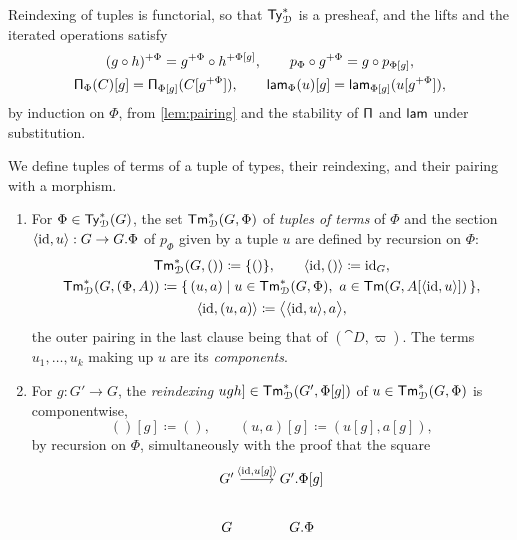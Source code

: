 Reindexing of tuples is functorial, so that $\mathsf{Ty}^*_{\mathcal{D}}$ is a presheaf, and the lifts and the iterated operations satisfy
\begin{equation}\label{eq:iterated-stability}
    \begin{gathered}
        (g \circ h)^{+\Phi} = g^{+\Phi} \circ h^{+\Phi[g]}, \qquad p_\Phi \circ g^{+\Phi} = g \circ p_{\Phi[g]},\\
        \mathsf{\Pi}_\Phi(C)[g] = \mathsf{\Pi}_{\Phi[g]}(C[g^{+\Phi}]), \qquad \mathsf{lam}_\Phi(u)[g] = \mathsf{lam}_{\Phi[g]}(u[g^{+\Phi}]),
    \end{gathered}
\end{equation}
by induction on $\Phi$, from \cref{lem:pairing} and the stability of $\mathsf{\Pi}$ and $\mathsf{lam}$ under substitution.

\begin{definition}\label{def:iterated-pairing}
    We define tuples of terms of a tuple of types, their reindexing, and their pairing with a morphism.
    \begin{enumerate}
        \item For $\Phi \in \mathsf{Ty}^*_{\mathcal{D}}(G)$, the set $\mathsf{Tm}^*_{\mathcal{D}}(G, \Phi)$ of \emph{tuples of terms} of $\Phi$ and the section $\langle \mathrm{id}, u \rangle : G \to G.\Phi$ of $p_\Phi$ given by a tuple $u$ are defined by recursion on $\Phi$:
        \begin{gather*}
            \mathsf{Tm}^*_{\mathcal{D}}(G, ()) \coloneqq \{()\}, \qquad \langle \mathrm{id}, () \rangle \coloneqq \mathrm{id}_G,\\
            \mathsf{Tm}^*_{\mathcal{D}}(G, (\Phi, A)) \coloneqq \{\, (u, a) \mid u \in \mathsf{Tm}^*_{\mathcal{D}}(G, \Phi),\ a \in \mathsf{Tm}(G, A[\langle \mathrm{id}, u \rangle]) \,\},\\
            \langle \mathrm{id}, (u, a) \rangle \coloneqq \big\langle \langle \mathrm{id}, u \rangle, a \big\rangle,
        \end{gather*}
        the outer pairing in the last clause being that of $(\cat{D}, \varpi)$. The terms $u_1, \ldots, u_k$ making up $u$ are its \emph{components}.
        \item For $g : G' \to G$, the \emph{reindexing} $ugh] \in \mathsf{Tm}^*_{\mathcal{D}}(G', \Phi[g])$ of $u \in \mathsf{Tm}^*_{\mathcal{D}}(G, \Phi)$ is componentwise,
        \[
            ()[g] \coloneqq (), \qquad (u, a)[g] \coloneqq (u[g], a[g]),
        \]
        by recursion on $\Phi$, simultaneously with the proof that the square
        \[\begin{tikzcd}
            {G'} & {G'.\Phi[g]} \\
            G & {G.\Phi}
            \arrow["{\langle \id, u[g] \rangle}", from=1-1, to=1-2]

\end{tikzcd}\]
\end{enumerate}
\end{definition}
